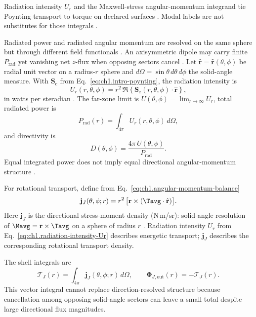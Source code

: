 Radiation intensity $U_r$ and the Maxwell-stress angular-momentum integrand tie Poynting transport to torque on declared surfaces \cite{poynting1884,belinfante1940,beth1936}. Modal labels are not substitutes for those integrals \cite{stratton1941}.

Radiated power and radiated angular momentum are resolved on the same sphere but through different field functionals \cite{stratton1941,beth1936}. An axisymmetric dipole may carry finite $P_{\mathrm{rad}}$ yet vanishing net $z$-flux when opposing sectors cancel \cite{stratton1941}. Let \(\hat{\mathbf{r}}=\hat{\mathbf{r}}(\theta,\phi)\) be radial unit vector on a
radius-\(r\) sphere and \(d\Omega=\sin\theta\,d\theta\,d\phi\) the solid-angle
measure. With \(\mathbf{S}_\mathrm{c}\) from Eq.~\eqref{eq:ch1.intro-poynting}, the radiation intensity is
\begin{equation}
\label{eq:ch1.radiation-intensity-Ur}
U_r(r,\theta,\phi)=
r^2\,\Re\!\left\{\mathbf{S}_\mathrm{c}(r,\theta,\phi)\cdot\hat{\mathbf{r}}\right\},
\end{equation}
in watts per steradian \cite{poynting1884,harrington2001}. The far-zone limit is $U(\theta,\phi)=\lim_{r\to\infty}U_r$, total radiated power is
\begin{equation}
\label{eq:ch1.directional-power-integral}
P_{\mathrm{rad}}(r)=\int_{4\pi}U_r(r,\theta,\phi)\,d\Omega,
\end{equation}
and directivity is
\begin{equation}
\label{eq:ch1.directivity-definition}
D(\theta,\phi)=\frac{4\pi\,U(\theta,\phi)}{P_{\mathrm{rad}}}.
\end{equation}
Equal integrated power does not imply equal directional angular-momentum structure \cite{stratton1941}.

For rotational transport, define from
Eq.~\eqref{eq:ch1.angular-momentum-balance}
\begin{equation}
\label{eq:ch1.directional-am-flux}
\mathbf{j}_J(\theta,\phi;r)=
r^2\,\big[\mathbf{r}\times(\Tavg\cdot\hat{\mathbf{r}})\big].
\end{equation}
Here $\mathbf{j}_J$ is the directional stress-moment density (N\,m/sr): solid-angle resolution of $\Mavg=\mathbf{r}\times\Tavg$ on a sphere of radius $r$ \cite{beth1936,stratton1941}. Radiation intensity $U_r$ from Eq.~\eqref{eq:ch1.radiation-intensity-Ur} describes energetic transport; $\mathbf{j}_J$ describes the corresponding rotational transport density.

The shell integrals are
\begin{equation}
\label{eq:ch1.directional-am-total}
\boldsymbol{\mathcal{T}}_J(r)=
\int_{4\pi}\mathbf{j}_J(\theta,\phi;r)\,d\Omega,
\qquad
\boldsymbol{\Phi}_{J,\mathrm{out}}(r)=-\boldsymbol{\mathcal{T}}_J(r).
\end{equation}
This vector integral cannot replace direction-resolved structure because cancellation among
opposing solid-angle sectors can leave a small total despite large directional flux
magnitudes.

